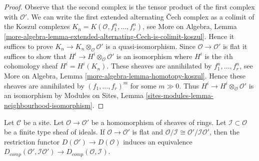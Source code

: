 \begin{proof}
Observe that the second complex is the tensor product of the first
complex with $\mathcal{O}'$. We can write the first extended
alternating {\v C}ech complex as a colimit of the Koszul complexes
$K_n = K(\mathcal{O}, f_1^n, \ldots, f_r^n)$, see
More on Algebra, Lemma
\ref{more-algebra-lemma-extended-alternating-Cech-is-colimit-koszul}.
Hence it suffices to prove $K_n \to K_n \otimes_\mathcal{O} \mathcal{O}'$
is a quasi-isomorphism. Since $\mathcal{O} \to \mathcal{O}'$ is flat
it suffices to show that $H^i \to H^i \otimes_\mathcal{O} \mathcal{O}'$
is an isomorphism where $H^i$ is the $i$th cohomology sheaf
$H^i = H^i(K_n)$. These sheaves are annihilated by $f_1^n, \ldots, f_r^n$, see
More on Algebra, Lemma \ref{more-algebra-lemma-homotopy-koszul}.
Hence these sheaves are annihilated by $(f_1, \ldots, f_r)^m$
for some $m \gg 0$. Thus $H^i \to H^i \otimes_\mathcal{O} \mathcal{O}'$
is an isomorphism by Modules on Sites, Lemma
\ref{sites-modules-lemma-neighbourhood-isomorphism}.
\end{proof}

\begin{lemma}
\label{lemma-restriction-derived-complete-equivalence}
Let $\mathcal{C}$ be a site. Let $\mathcal{O} \to \mathcal{O}'$ be a
homomorphism of sheaves of rings. Let $\mathcal{I} \subset \mathcal{O}$
be a finite type sheaf of ideals.
If $\mathcal{O} \to \mathcal{O}'$ is flat and
$\mathcal{O}/\mathcal{I} \cong \mathcal{O}'/\mathcal{I}\mathcal{O}'$,
then the restriction functor $D(\mathcal{O}') \to D(\mathcal{O})$
induces an equivalence
$D_{comp}(\mathcal{O}', \mathcal{I}\mathcal{O}') \to
D_{comp}(\mathcal{O}, \mathcal{I})$.
\end{lemma}

